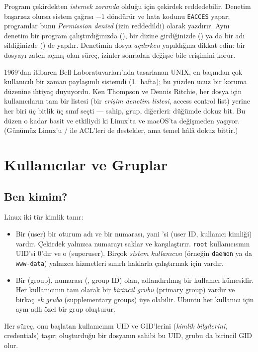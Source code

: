 Program çekirdekten \emph{istemek zorunda} olduğu için çekirdek reddedebilir. Denetim başarısız olursa sistem çağrısı $-1$ döndürür ve hata kodunu \texttt{EACCES} yapar; programlar bunu \emph{Permission denied} (izin reddedildi) olarak yazdırır. Aynı denetim bir program çalıştırdığınızda (), bir dizine girdiğinizde () ya da bir adı sildiğinizde () de yapılır. Denetimin dosya \emph{açılırken} yapıldığına dikkat edin: bir dosyayı zaten açmış olan süreç, izinler sonradan değişse bile erişimini korur.


\begin{histnote}
1969'dan itibaren Bell Laboratuvarları'nda tasarlanan UNIX, en başından çok kullanıcılı bir zaman paylaşımlı sistemdi (1.~hafta); bu yüzden ucuz bir koruma düzenine ihtiyaç duyuyordu. Ken Thompson ve Dennis Ritchie, her dosya için kullanıcıların tam bir listesi (bir \emph{erişim denetim listesi}, access control list) yerine her biri üç bitlik üç sınıf seçti --- sahip, grup, diğerleri: düğümde dokuz bit. Bu düzen o kadar basit ve etkiliydi ki Linux'ta ve macOS'ta değişmeden yaşıyor. (Günümüz Linux'u / ile ACL'leri de destekler, ama temel hâlâ dokuz bittir.)
\end{histnote}

\section{Kullanıcılar ve Gruplar}

\subsection{Ben kimim?}
\label{sec:who}

Linux iki tür kimlik tanır:
\begin{itemize}
  \item Bir  (user) bir oturum adı ve bir numarası, yani 'si (user ID, kullanıcı kimliği) vardır. Çekirdek yalnızca numarayı saklar ve karşılaştırır. \texttt{root} kullanıcısının UID'si $0$'dır ve o  (superuser). Birçok \emph{sistem kullanıcısı} (örneğin \texttt{daemon} ya da \texttt{www-data}) yalnızca hizmetleri sınırlı haklarla çalıştırmak için vardır.
  \item Bir  (group), numarası (, group ID) olan, adlandırılmış bir kullanıcı kümesidir. Her kullanıcının tam olarak bir \emph{birincil grubu} (primary group) vardır ve birkaç \emph{ek gruba} (supplementary groups) üye olabilir. Ubuntu her kullanıcı için aynı adlı özel bir grup oluşturur.
\end{itemize}
Her süreç, onu başlatan kullanıcının UID ve GID'lerini (\emph{kimlik bilgilerini}, credentials) taşır; oluşturduğu bir dosyanın sahibi bu UID, grubu da birincil GID olur.

